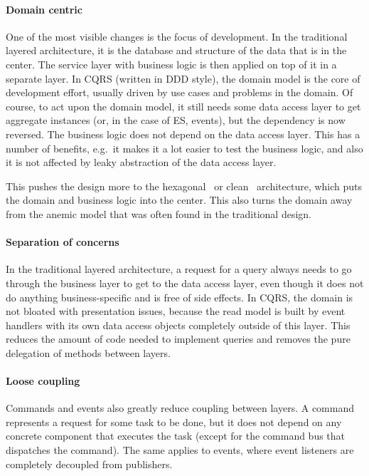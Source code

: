 \documentclass{book}
\begin{document}
\paragraph{Domain centric}\label{domain-centric}

One of the most visible changes is the focus of development. In the
traditional layered architecture, it is the database and structure of
the data that is in the center. The service layer with business logic is
then applied on top of it in a separate layer. In CQRS (written in DDD
style), the domain model is the core of development effort, usually
driven by use cases and problems in the domain. Of course, to act upon
the domain model, it still needs some data access layer to get aggregate
instances (or, in the case of ES, events), but the dependency is now
reversed. The business logic does not depend on the data access layer.
This has a number of benefits, e.g.~it makes it a lot easier to test the
business logic, and also it is not affected by leaky abstraction of the
data access layer.

This pushes the design more to the hexagonal~\cite{hex} or clean~\cite{clean} architecture, which puts the domain and business logic into
the center. This also turns the domain away from the anemic model that
was often found in the traditional design.

\paragraph{Separation of concerns}\label{separation-of-concerns}

In the traditional layered architecture, a request for a query always
needs to go through the business layer to get to the data access layer,
even though it does not do anything business-specific and is free of
side effects. In CQRS, the domain is not bloated with presentation
issues, because the read model is built by event handlers with its own
data access objects completely outside of this layer. This reduces the
amount of code needed to implement queries and removes the pure
delegation of methods between layers.

\paragraph{Loose coupling}\label{loose-coupling}

Commands and events also greatly reduce coupling between layers. A
command represents a request for some task to be done, but it does not
depend on any concrete component that executes the task (except for the
command bus that dispatches the command). The same applies to events,
where event listeners are completely decoupled from publishers.
\end{document}
